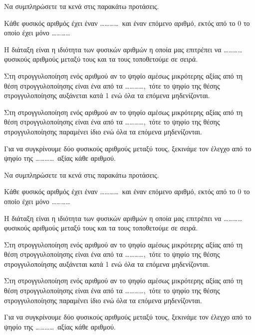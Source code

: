 Να συμπληρώσετε τα κενά στις παρακάτω προτάσεις.
\begin{rlist}
\item Κάθε φυσικός αριθμός έχει έναν \ldots\ldots\ldots\ldots\, και έναν επόμενο αριθμό, εκτός από το 0 το οποίο έχει μόνο \ldots\ldots\ldots\ldots
\item Η διάταξη είναι η ιδιότητα των φυσικών αριθμών η οποία μας επιτρέπει να \ldots\ldots\ldots\ldots\, φυσικούς αριθμούς μεταξύ τους και τα τους τοποθετούμε σε σειρά.
\item Στη στρογγυλοποίηση ενός αριθμού αν το ψηφίο αμέσως μικρότερης αξίας από τη θέση στρογγυλοποίησης είναι ένα από τα \ldots\ldots\ldots\ldots,\, τότε το ψηφίο της θέσης στρογγυλοποίησης αυξάνεται κατά 1 ενώ όλα τα επόμενα μηδενίζονται.
\item Στη στρογγυλοποίηση ενός αριθμού αν το ψηφίο αμέσως μικρότερης αξίας από τη θέση στρογγυλοποίησης είναι ένα από τα \ldots\ldots\ldots\ldots,\, τότε το ψηφίο της θέσης στρογγυλοποίησης παραμένει ίδιο ενώ όλα τα επόμενα μηδενίζονται.
\item Για να συγκρίνουμε δύο φυσικούς αριθμούς μεταξύ τους, ξεκινάμε τον έλεγχο από το ψηφίο της \ldots\ldots\ldots\ldots\, αξίας κάθε αριθμού.
\end{rlist}
Να συμπληρώσετε τα κενά στις παρακάτω προτάσεις.
\begin{rlist}
\item Κάθε φυσικός αριθμός έχει έναν \ldots\ldots\ldots\ldots\, και έναν επόμενο αριθμό, εκτός από το 0 το οποίο έχει μόνο \ldots\ldots\ldots\ldots
\item Η διάταξη είναι η ιδιότητα των φυσικών αριθμών η οποία μας επιτρέπει να \ldots\ldots\ldots\ldots\, φυσικούς αριθμούς μεταξύ τους και τα τους τοποθετούμε σε σειρά.
\item Στη στρογγυλοποίηση ενός αριθμού αν το ψηφίο αμέσως μικρότερης αξίας από τη θέση στρογγυλοποίησης είναι ένα από τα \ldots\ldots\ldots\ldots,\, τότε το ψηφίο της θέσης στρογγυλοποίησης αυξάνεται κατά 1 ενώ όλα τα επόμενα μηδενίζονται.
\item Στη στρογγυλοποίηση ενός αριθμού αν το ψηφίο αμέσως μικρότερης αξίας από τη θέση στρογγυλοποίησης είναι ένα από τα \ldots\ldots\ldots\ldots,\, τότε το ψηφίο της θέσης στρογγυλοποίησης παραμένει ίδιο ενώ όλα τα επόμενα μηδενίζονται.
\item Για να συγκρίνουμε δύο φυσικούς αριθμούς μεταξύ τους, ξεκινάμε τον έλεγχο από το ψηφίο της \ldots\ldots\ldots\ldots\, αξίας κάθε αριθμού.
\end{rlist}
